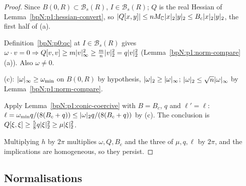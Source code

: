 \begin{proof}
\label{stepN:p1:qc-reg} Since $B(0,R)\subset\mathcal B_s(R)$, $I\in\mathcal B_s(R)$; $Q$ is the real Hessian of Lemma~\ref{bpN:p1:hessian-convert}, so $\lvert Q[x,y]\rvert\le nM_{\mathbb{C}}\lvert x\rvert_2\lvert y\rvert_2\le B_c\lvert x\rvert_2\lvert y\rvert_2$, the first half of (a).

\label{stepN:p1:qc-trans} Definition~\ref{bpN:p0:qc} at $I\in\mathcal B_s(R)$ gives $\omega\cdot v=0\Rightarrow Q[v,v]\ge m\lvert v\rvert_\infty^2\ge\frac mn\lvert v\rvert_2^2=q\lvert v\rvert_2^2$ (Lemma~\ref{bpN:p1:norm-compare}(a)). Also $\omega\ne0$.

\label{stepN:p1:qc-freq} (c): $\lvert \omega\rvert_\infty\ge\omega_{\min}$ on $B(0,R)$ by hypothesis, $\lvert \omega\rvert_2\ge\lvert \omega\rvert_\infty$; $\lvert \omega\rvert_2\le\sqrt n\lvert \omega\rvert_\infty$ by Lemma~\ref{bpN:p1:norm-compare}.

\label{stepN:p1:qc-conic} Apply Lemma~\ref{bpN:p1:conic-coercive} with $B=B_c$, $q$ and $\ell'=\ell$: $\ell=\omega_{\min}q/(8(B_c+q))\le\lvert \omega\rvert_2q/(8(B_c+q))$ by (c). The conclusion is $Q[\xi,\xi]\ge\frac58q\lvert \xi\rvert_2^2\ge\mu\lvert \xi\rvert_2^2$.

\label{stepN:p1:qc-scale} Multiplying $h$ by $2\pi$ multiplies $\omega,Q,B_c$ and the three of $\mu,q,\ell$ by $2\pi$, and the implications are homogeneous, so they persist.
\end{proof}

\subsection{Normalisations}\label{bpN:p1:s-period}

